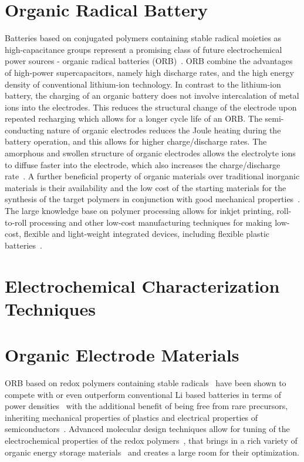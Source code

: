 \section{Organic Radical Battery}

Batteries based on conjugated polymers containing stable radical moieties as high-capacitance groups represent a promising class of future electrochemical power sources - organic radical batteries (ORB)~\cite{nakahara2002_cpl, nishide2004_electact,xie2021_mathoriz,Rohland2022}. ORB combine the advantages of high-power supercapacitors, namely high discharge rates, and the high energy density of conventional lithium-ion technology. In contrast to the lithium-ion battery, the charging of an organic battery does not involve intercalation of metal ions into the electrodes. This reduces the structural change of the electrode upon repeated recharging which allows for a longer cycle life of an ORB. The semi-conducting nature of organic electrodes reduces the Joule heating during the battery operation, and this allows for higher charge/discharge rates. The amorphous and swollen structure of organic electrodes allows the electrolyte ions to diffuse faster into the electrode, which also increases the charge/discharge rate~\cite{nishide_2009}. A further beneficial property of organic materials over traditional inorganic materials is their availability and the low cost of the starting materials for the synthesis of the target polymers in conjunction with good mechanical properties~\cite{janoschka2012_advmater, muench2016_chemrev, friebe2017_topcurrchem}. The large knowledge base on polymer processing allows for inkjet printing, roll-to-roll processing and other low-cost manufacturing techniques for making low-cost, flexible and light-weight integrated devices, including flexible plastic batteries~\cite{janoschka2012_advmater,nishide_2009}. 
\par
\section{Electrochemical Characterization Techniques}


\section{Organic Electrode Materials}
ORB based on redox polymers containing stable radicals~\cite{nakahara2002_cpl} have been shown to compete with or even outperform  conventional Li based batteries in terms of power densities~\cite{IWASA2007} with the additional benefit of being free from rare precursors, inheriting mechanical properties of plastics and electrical properties of semiconductors~\cite{friebe2017_topcurrchem,Casado2021,Goujon2021}. Advanced molecular design techniques allow for tuning of the electrochemical properties of the redox polymers~\cite{Janoschka2017}, that brings in a rich variety of organic energy storage materials~\cite{Xie2021,Vereshchagin2022,Janoschka2017a} and creates a large room for their optimization. 

